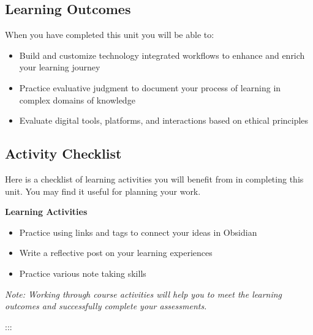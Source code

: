 \documentclass[
  letterpaper,
  DIV=11,
  numbers=noendperiod]{scrreprt}
\providecommand{\tightlist}{%
  \setlength{\itemsep}{0pt}\setlength{\parskip}{0pt}}\usepackage{longtable,booktabs,array}
\begin{document}
\subsection*{Learning Outcomes}\label{learning-outcomes-1}

When you have completed this unit you will be able to:

\begin{itemize}
\tightlist
\item
  Build and customize technology integrated workflows to enhance and
  enrich your learning journey
\item
  Practice evaluative judgment to document your process of learning in
  complex domains of knowledge
\item
  Evaluate digital tools, platforms, and interactions based on ethical
  principles
\end{itemize}

\subsection*{Activity Checklist}\label{activity-checklist-2}

Here is a checklist of learning activities you will benefit from in
completing this unit. You may find it useful for planning your work.

\textbf{Learning Activities}

\begin{itemize}
\tightlist
\item
  Practice using links and tags to connect your ideas in Obsidian
\item
  Write a reflective post on your learning experiences
\item
  Practice various note taking skills
\end{itemize}

\begin{tcolorbox}[enhanced jigsaw, toprule=.15mm, colback=white, colframe=quarto-callout-note-color-frame, arc=.35mm, opacityback=0, breakable, rightrule=.15mm, bottomrule=.15mm, leftrule=.75mm, left=2mm]

\emph{Note: Working through course activities will help you to meet the
learning outcomes and successfully complete your assessments.}

\end{tcolorbox}

:::
\end{document}
